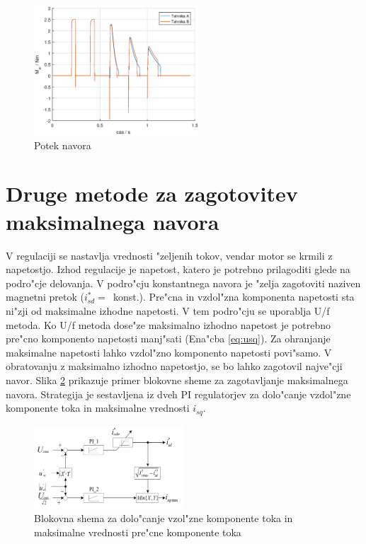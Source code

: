 \documentclass[journal,a4paper,twoside]{sty/IEEEtran}
\begin{document}
\begin{figure}
\includegraphics[width=0.55\textwidth]{fig_Mel.eps}
\caption{Potek navora}
\label{fig:Mel}
\end{figure}

\section{Druge metode za zagotovitev maksimalnega navora}

V regulaciji se nastavlja vrednosti "zeljenih tokov, vendar motor se krmili z napetostjo. Izhod regulacije je napetost, katero je potrebno prilagoditi glede na  podro"cje delovanja. V podro"cju konstantnega navora je "zelja zagotoviti naziven magnetni pretok ($i_{sd}^*=$~konst.).
Pre"cna in vzdol"zna komponenta napetosti sta ni"zji od maksimalne izhodne napetosti. V tem podro"cju se uporablja U/f metoda. \cite{servopogoni} Ko U/f metoda dose"ze maksimalno izhodno napetost je potrebno pre"cno komponento napetosti manj"sati (Ena"cba \ref{eq:usq}). Za ohranjanje maksimalne napetosti lahko vzdol"zno komponento napetosti povi"samo. V obratovanju z maksimalno izhodno napetostjo, se bo lahko zagotovil najve"cji navor. Slika \ref{fig:MTPA_strategy} prikazuje primer blokovne sheme za zagotavljanje maksimalnega navora. Strategija je sestavljena iz dveh PI regulatorjev za dolo"canje vzdol"zne komponente toka in maksimalne vrednosti $i_{sq}$.

\begin{figure}
\includegraphics[width=0.5\textwidth]{MTPA_prva.png}
\caption{Blokovna shema za dolo"canje vzol"zne komponente toka in maksimalne vrednosti pre"cne komponente toka\cite{MTPA}}
\label{fig:MTPA_strategy}
\end{figure}
\end{document}
